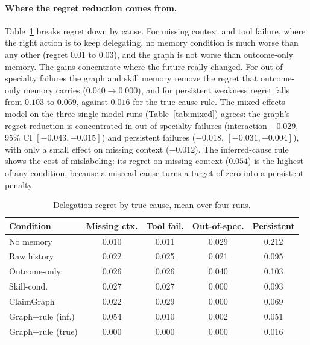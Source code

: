 \documentclass[letterpaper]{article}
\begin{document}
\paragraph{Where the regret reduction comes from.}
Table~\ref{tab:cause} breaks regret down by cause. For missing context and tool failure, where the right action is to keep delegating, no memory condition is much worse than any other (regret $0.01$ to $0.03$), and the graph is not worse than outcome-only memory. The gains concentrate where the future really changed. For out-of-specialty failures the graph and skill memory remove the regret that outcome-only memory carries ($0.040\to0.000$), and for persistent weakness regret falls from $0.103$ to $0.069$, against $0.016$ for the true-cause rule. The mixed-effects model on the three single-model runs (Table~\ref{tab:mixed}) agrees: the graph's regret reduction is concentrated in out-of-specialty failures (interaction $-0.029$, 95\% CI $[-0.043,-0.015]$) and persistent failures ($-0.018$, $[-0.031,-0.004]$), with only a small effect on missing context ($-0.012$). The inferred-cause rule shows the cost of mislabeling: its regret on missing context ($0.054$) is the highest of any condition, because a misread cause turns a target of zero into a persistent penalty.

\begin{table}[t]
\centering\scriptsize
\setlength{\tabcolsep}{3pt}
\begin{tabular}{lcccc}
\toprule
Condition & Missing ctx. & Tool fail. & Out-of-spec. & Persistent\\
\midrule
No memory & 0.010 & 0.011 & 0.029 & 0.212 \\
Raw history & 0.022 & 0.025 & 0.021 & 0.095 \\
Outcome-only & 0.026 & 0.026 & 0.040 & 0.103 \\
Skill-cond. & 0.027 & 0.027 & 0.000 & 0.093 \\
ClaimGraph & 0.022 & 0.029 & 0.000 & 0.069 \\
Graph+rule (inf.) & 0.054 & 0.010 & 0.002 & 0.051 \\
Graph+rule (true) & 0.000 & 0.000 & 0.000 & 0.016 \\
\bottomrule
\end{tabular}
\caption{Delegation regret by true cause, mean over four runs.}
\label{tab:cause}
\end{table}
\end{document}
